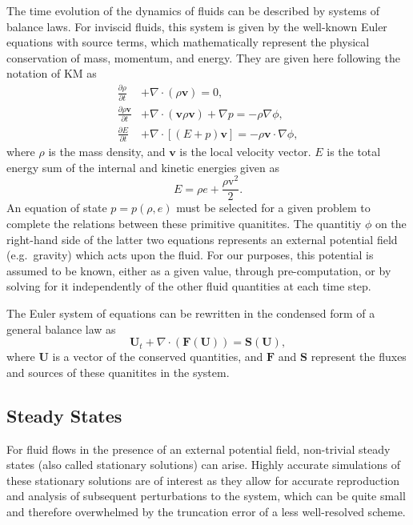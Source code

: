 The time evolution of the dynamics of fluids can be described by systems of balance laws. For inviscid fluids, this system is given by the well-known Euler equations with source terms, which mathematically represent the physical conservation of mass, momentum, and energy. They are given here following the notation of KM as
\begin{subequations} \label{eq:eulerFull}
\begin{align}
\frac{\partial{\rho}}{\partial{t}} &+ \nabla \cdot (\rho \mathbf{v}) = 0,\\
\frac{\partial{\rho \mathbf{v}}}{\partial{t}} &+ \nabla \cdot (\mathbf{v} \rho \mathbf{v}) + \nabla p = -\rho \nabla \phi,\\
\frac{\partial{E}}{\partial{t}} &+ \nabla \cdot \left[(E+p)\mathbf{v}\right] = -\rho \mathbf{v} \cdot \nabla \phi,
\end{align}
\end{subequations}
where $\rho$ is the mass density, and $\mathbf{v}$ is the local velocity vector. $E$ is the total energy sum of the internal and kinetic energies given as
\begin{equation}
E=\rho e + \frac{\rho \mathrm{v}^2}{2}.
\end{equation}
An equation of state $p=p(\rho,e)$ must be selected for a given problem to complete the relations between these primitive quanitites. The quantitiy $\phi$ on the right-hand side of the latter two equations represents an external potential field (e.g.\ gravity) which acts upon the fluid. For our purposes, this potential is assumed to be known, either as a given value, through pre-computation, or by solving for it independently of the other fluid quantities at each time step.

The Euler system of equations can be rewritten in the condensed form of a general balance law as
\begin{equation} \label{eq:euler}
\mathbf{U}_t+\nabla\cdot(\mathbf{F}(\mathbf{U}))=\mathbf{S}(\mathbf{U}),
\end{equation}
where $\mathbf{U}$ is a vector of the conserved quantities, and $\mathbf{F}$ and $\mathbf{S}$ represent the fluxes and sources of these quanitites in the system.

\subsection{Steady States}

For fluid flows in the presence of an external potential field, non-trivial steady states (also called stationary solutions) can arise. Highly accurate simulations of these stationary solutions are of interest as they allow for accurate reproduction and analysis of subsequent perturbations to the system, which can be quite small and therefore overwhelmed by the truncation error of a less well-resolved scheme.


